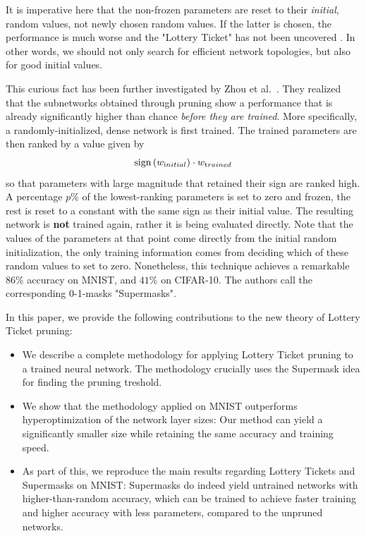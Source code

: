 \documentclass[12pt,final,twoside]{article}
\theoremstyle{plain}
\theoremstyle{definition}
\theoremstyle{remark}
\theoremstyle{named}
\begin{document}
It is imperative here that the non-frozen parameters are reset to their \textit{initial}, random values, not newly chosen random values. If the latter is chosen, the performance is much worse and the "Lottery Ticket" has not been uncovered \cite{lottery}. In other words, we should not only search for efficient network topologies, but also for good initial values.

This curious fact has been further investigated by Zhou et al.\ \cite{supermask}. They realized that the subnetworks obtained through pruning show a performance that is already significantly higher than chance \textit{before they are trained}. More specifically, a randomly-initialized, dense network is first trained. The trained parameters are then ranked by a value given by
$$
\operatorname{sign}\left(w_{\text initial}\right) \cdot w_{\text trained}
$$
so that parameters with large magnitude that retained their sign are ranked high. A percentage $p\%$ of the lowest-ranking parameters is set to zero and frozen, the rest is reset to a constant with the same sign as their initial value. The resulting network is \textbf{not} trained again, rather it is being evaluated directly. Note that the values of the parameters at that point come directly from the initial random initialization, the only training information comes from deciding which of these random values to set to zero. Nonetheless, this technique achieves a remarkable $86\%$ accuracy on MNIST, and $41\%$ on CIFAR-10. The authors call the corresponding 0-1-masks "Supermasks".

In this paper, we provide the following contributions to the new theory of Lottery Ticket pruning:
\begin{itemize}[noitemsep]
\item We describe a complete methodology for applying Lottery Ticket pruning to a trained neural network. The methodology crucially uses the Supermask idea for finding the pruning treshold.
\item We show that the methodology applied on MNIST outperforms hyperoptimization of the network layer sizes: Our method can yield a significantly smaller size while retaining the same accuracy and training speed.
\item As part of this, we reproduce the main results regarding Lottery Tickets \cite{lottery} and Supermasks \cite{supermask} on MNIST: Supermasks do indeed yield untrained networks with higher-than-random accuracy, which can be trained to achieve faster training and higher accuracy with less parameters, compared to the unpruned networks.
\end{itemize}
\end{document}
